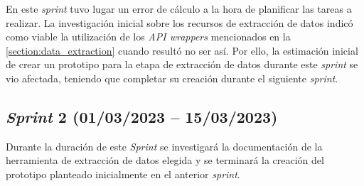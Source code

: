 En este \textit{sprint} tuvo lugar un error de cálculo a la hora de planificar las tareas a realizar. La investigación inicial sobre los recursos de extracción de datos indicó como viable la utilización de los \textit{API wrappers} mencionados en la \autoref{section:data_extraction} cuando resultó no ser así. Por ello, la estimación inicial de crear un prototipo para la etapa de extracción de datos durante este \textit{sprint} se vio afectada, teniendo que completar su creación durante el siguiente \textit{sprint}.

\subsection{\textit{Sprint} 2 (01/03/2023 -- 15/03/2023)}

Durante la duración de este \textit{Sprint} se investigará la documentación de la herramienta de extracción de datos elegida y se terminará la creación del prototipo planteado inicialmente en el anterior \textit{sprint}.

